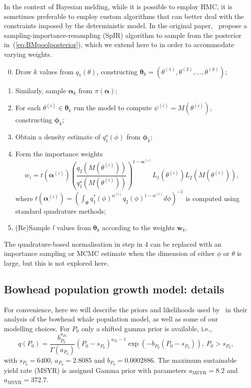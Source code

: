 \documentclass[a4paper, notitlepage, 11pt]{article}
\begin{document}
In the context of Bayesian melding, while it is possible to employ HMC, it is sometimes preferable to employ custom algorithms that can better deal with the constraints imposed by the deterministic model.
In the original paper,~\cite[sec. 3.4]{Poole2000} propose a sampling-importance-resampling (SpIR) algorithm to sample from the posterior in~(\ref{eq:BMpoolposterior}), which we extend here to in order to accommodate varying weights.
\begin{enumerate}
\setcounter{enumi}{-1}
 \item Draw $k$ values from  $q_1(\theta)$, constructing $\boldsymbol \theta_k = (\theta^{(1)}, \theta^{(2)}, \ldots, \theta^{(k)} )$;
 \item Similarly, sample $\boldsymbol \alpha_k$ from $\pi(\boldsymbol \alpha)$;
 \item For each $\theta^{(i)} \in \boldsymbol\theta_k$ run the model to compute $\psi^{(i)} = M(\theta^{(i)})$, constructing $\boldsymbol \phi_k$;
 \item Obtain a density estimate of $q_1^\star(\phi)$ from  $\boldsymbol \phi_k$;
 \item Form the importance weights 
 \begin{equation}
 \label{eq:SpIRweights}
  w_i = t\left(\boldsymbol \alpha^{(i)}\right) \left(\frac{q_2(M(\theta^{(i)}))}{q_1^\star(M(\theta^{(i)}))}\right)^{1 - \boldsymbol \alpha^{(i)}} L_1(\theta^{(i)}) L_2(M(\theta^{(i)})),
 \end{equation}
where $t\left(\boldsymbol \alpha^{(i)}\right) = \left( \int_{\Phi} q_1^\ast(\phi)^{\alpha^{(i)}} q_2(\phi)^{1-\alpha^{(i)}} d\phi \right)^{-1}$ is computed using standard quadrature methods;
 \item (Re)Sample $l$ values from $\boldsymbol \theta_k$ according to the weights $\boldsymbol w_k$.
\end{enumerate}
The quadrature-based normalisation in step in 4 can be replaced with an importance sampling or MCMC estimate when the dimension of either $\phi$ or $\theta$ is large, but this is not explored here.


\newpage
\subsection{Bowhead population growth model: details}
\label{sec:appendix_bowhead}

For convenience, here we will describe the priors and likelihoods used by~\cite{Poole2000} in their analysis of the bowhead whale population model, as well as some of our modelling choices.
For $P_0$ only a shifted gamma prior is available, i.e.,
\begin{equation*}
 q(P_0) = \frac{b_{P_0}^{a_{P_0}}}{\Gamma(a_{P_0})} (P_0 - s_{P_0})^{a_{P_0}-1} \exp\left(-b_{P_0}(P_0 - s_{P_0})\right), \: P_0 > s_{P_0},
\end{equation*}
with $s_{P_0} = 6400$, $a_{P_0} = 2.8085$ and $b_{P_0} = 0.0002886$.
The maximum sustainable yield rate (MSYR) is assigned Gamma prior with parameters $a_{\text{MSYR}} = 8.2$ and $a_{\text{MSYR}} = 372.7$.
\end{document}
